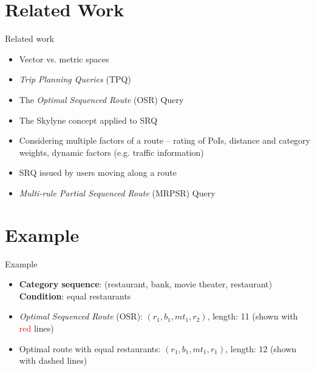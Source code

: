 \documentclass[18pt]{beamer}
\begin{document}
\section{Related Work}
	\begin{frame}{Related work}
	
		\begin{itemize}
			\item Vector vs. metric spaces
			\item \textit{Trip Planning Queries} (TPQ) \cite{tpq}
			\item The \textit{Optimal Sequenced Route} (OSR) Query \cite{osr}
			\item The Skylyne concept applied to SRQ \cite{skyline}
			\item Considering multiple factors of a route – rating of PoIs, distance and category weights, dynamic factors (e.g. traffic information) \cite{factors}
			\item SRQ issued by users moving along a route \cite{moving}
			\item \textit{Multi-rule Partial Sequenced Route} (MRPSR) Query \cite{multi}
		\end{itemize}
	
	\end{frame}

\section{Example}
	\begin{frame}{Example}
	
		\begin{itemize}
			\item \textbf{Category sequence}: (restaurant, bank, movie theater, restaurant) 
			\textbf{Condition}: equal restaurants
			\pause
			\item \textit{Optimal Sequenced Route} (OSR): $(r_1, b_1, mt_1, r_2)$, length: 11 (shown with \textcolor{red}{red} lines)
			\item Optimal route with equal restaurants: $(r_1, b_1, mt_1, r_1)$, length: 12 (shown with dashed lines)
		\end{itemize}
	
	
	\end{frame}
\end{document}
